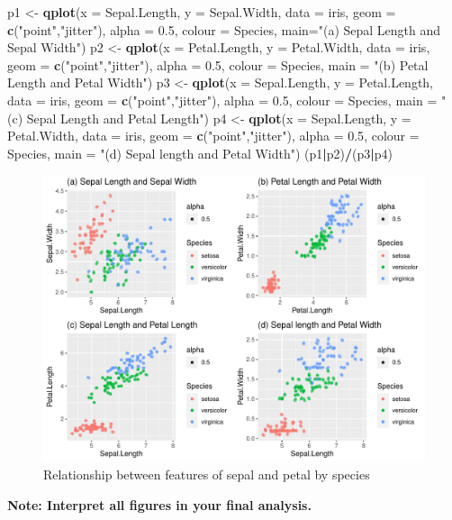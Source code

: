 \documentclass[]{article}
\newenvironment{Shaded}{\begin{snugshade}}{\end{snugshade}}
\newcommand{\DataTypeTok}[1]{\textcolor[rgb]{0.13,0.29,0.53}{#1}}
\newcommand{\FloatTok}[1]{\textcolor[rgb]{0.00,0.00,0.81}{#1}}
\newcommand{\KeywordTok}[1]{\textcolor[rgb]{0.13,0.29,0.53}{\textbf{#1}}}
\newcommand{\NormalTok}[1]{#1}
\newcommand{\OperatorTok}[1]{\textcolor[rgb]{0.81,0.36,0.00}{\textbf{#1}}}
\newcommand{\StringTok}[1]{\textcolor[rgb]{0.31,0.60,0.02}{#1}}
\begin{document}
\begin{Shaded}
\begin{Highlighting}[]
\NormalTok{p1 <-}\StringTok{ }\KeywordTok{qplot}\NormalTok{(}\DataTypeTok{x =}\NormalTok{ Sepal.Length, }\DataTypeTok{y =}\NormalTok{ Sepal.Width, }\DataTypeTok{data =}\NormalTok{ iris, }\DataTypeTok{geom =} \KeywordTok{c}\NormalTok{(}\StringTok{"point"}\NormalTok{,}\StringTok{"jitter"}\NormalTok{), }
      \DataTypeTok{alpha =} \FloatTok{0.5}\NormalTok{, }\DataTypeTok{colour =}\NormalTok{ Species, }
      \DataTypeTok{main=}\StringTok{"(a) Sepal Length and Sepal Width"}\NormalTok{)}
\NormalTok{p2 <-}\StringTok{ }\KeywordTok{qplot}\NormalTok{(}\DataTypeTok{x =}\NormalTok{ Petal.Length, }\DataTypeTok{y =}\NormalTok{ Petal.Width, }\DataTypeTok{data =}\NormalTok{ iris, }\DataTypeTok{geom =} \KeywordTok{c}\NormalTok{(}\StringTok{"point"}\NormalTok{,}\StringTok{"jitter"}\NormalTok{), }
      \DataTypeTok{alpha =} \FloatTok{0.5}\NormalTok{, }\DataTypeTok{colour =}\NormalTok{ Species, }
      \DataTypeTok{main =} \StringTok{"(b) Petal Length and Petal Width"}\NormalTok{)}
\NormalTok{p3 <-}\StringTok{ }\KeywordTok{qplot}\NormalTok{(}\DataTypeTok{x =}\NormalTok{ Sepal.Length, }\DataTypeTok{y =}\NormalTok{ Petal.Length, }\DataTypeTok{data =}\NormalTok{ iris, }\DataTypeTok{geom =} \KeywordTok{c}\NormalTok{(}\StringTok{"point"}\NormalTok{,}\StringTok{"jitter"}\NormalTok{), }
      \DataTypeTok{alpha =} \FloatTok{0.5}\NormalTok{, }\DataTypeTok{colour =}\NormalTok{ Species, }
      \DataTypeTok{main =} \StringTok{"(c) Sepal Length and Petal Length"}\NormalTok{)}
\NormalTok{p4 <-}\StringTok{ }\KeywordTok{qplot}\NormalTok{(}\DataTypeTok{x =}\NormalTok{ Sepal.Length, }\DataTypeTok{y =}\NormalTok{ Petal.Width, }\DataTypeTok{data =}\NormalTok{ iris, }\DataTypeTok{geom =} \KeywordTok{c}\NormalTok{(}\StringTok{"point"}\NormalTok{,}\StringTok{"jitter"}\NormalTok{), }
      \DataTypeTok{alpha =} \FloatTok{0.5}\NormalTok{, }\DataTypeTok{colour =}\NormalTok{ Species, }
      \DataTypeTok{main =} \StringTok{"(d) Sepal length and Petal Width"}\NormalTok{)}
\NormalTok{(p1}\OperatorTok{|}\NormalTok{p2)}\OperatorTok{/}\NormalTok{(p3}\OperatorTok{|}\NormalTok{p4)}
\end{Highlighting}
\end{Shaded}

\begin{figure}
\centering
\includegraphics{Week3Answers_files/figure-latex/unnamed-chunk-25-1.pdf}
\caption{Relationship between features of sepal and petal by species}
\end{figure}

\textbf{Note: Interpret all figures in your final analysis.}
\end{document}

